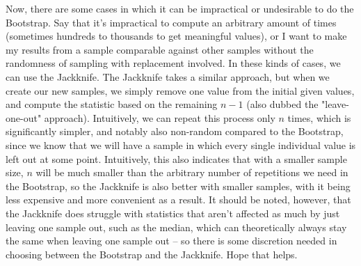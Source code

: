 \documentclass{article}
\begin{document}
{Now, there are some cases in which it can be impractical or undesirable to do the Bootstrap. Say that it's impractical to compute an arbitrary amount of times (sometimes hundreds to thousands to get meaningful values), or I want to make my results from a sample comparable against other samples without the randomness of sampling with replacement involved. In these kinds of cases, we can use the Jackknife. The Jackknife takes a similar approach, but when we create our new samples, we simply remove one value from the initial given values, and compute the statistic based on the remaining \(n-1\) (also dubbed the "leave-one-out" approach). Intuitively, we can repeat this process only \(n\) times, which is significantly simpler, and notably also non-random compared to the Bootstrap, since we know that we will have a sample in which every single individual value is left out at some point. Intuitively, this also indicates that with a smaller sample size, \(n\) will be much smaller than the arbitrary number of repetitions we need in the Bootstrap, so the Jackknife is also better with smaller samples, with it being less expensive and more convenient as a result. It should be noted, however, that the Jackknife does struggle with statistics that aren't affected as much by just leaving one sample out, such as the median, which can theoretically always stay the same when leaving one sample out -- so there is some discretion needed in choosing between the Bootstrap and the Jackknife. Hope that helps.

}
\end{document}
